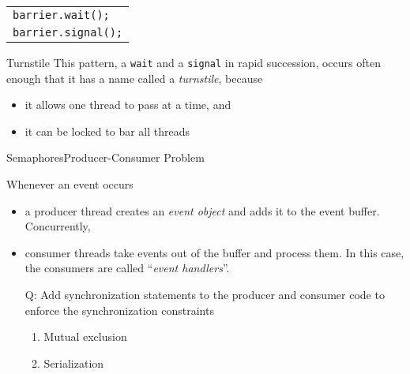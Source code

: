 \begin{frame}%
  \begin{center}
    \begin{tabular}{l}
      \texttt{barrier.wait();}\\
      \texttt{barrier.signal();}
    \end{tabular}
  \end{center}
  \begin{block}{Turnstile}
    This pattern, a \texttt{wait} and a \texttt{signal} in rapid succession, occurs often
    enough that it has a name called a \emph{turnstile}, because
    \begin{itemize}
    \item it allows one thread to pass at a time, and
    \item it can be locked to bar all threads
    \end{itemize}
  \end{block}
\end{frame}

\begin{frame}{Semaphores}{Producer-Consumer Problem}
  \begin{block}{Whenever an event occurs}
    \begin{itemize}
    \item a producer thread creates an \emph{event object} and adds it to the event
      buffer. Concurrently,
    \item consumer threads take events out of the buffer and process them. In this case,
      the consumers are called ``\emph{event handlers}''.
    \end{itemize}
  \end{block}
  \begin{center}
     
  \end{center}
  \begin{itemize}
  \item[Q:] Add synchronization statements to the producer and consumer code to enforce
    the synchronization constraints
    \begin{enumerate}
    \item Mutual exclusion
    \item Serialization
    \end{enumerate}
  \end{itemize}
\end{frame}

